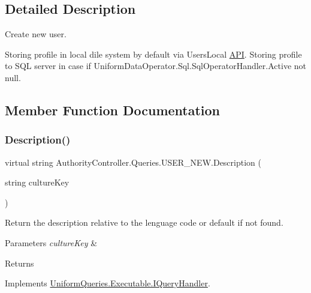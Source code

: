 \subsection{Detailed Description}
Create new user. 

Storing profile in local dile system by default via Users\+Local \mbox{\hyperlink{namespace_authority_controller_1_1_a_p_i}{A\+PI}}. Storing profile to S\+QL server in case if {\ttfamily Uniform\+Data\+Operator.\+Sql.\+Sql\+Operator\+Handler.\+Active} not null. 

\subsection{Member Function Documentation}
\mbox{\label{class_authority_controller_1_1_queries_1_1_u_s_e_r___n_e_w_a16439c165f3ac2ca8b586dd8bfd2bf55}} 
\subsubsection{\texorpdfstring{Description()}{Description()}}
{\footnotesize\ttfamily virtual string Authority\+Controller.\+Queries.\+U\+S\+E\+R\+\_\+\+N\+E\+W.\+Description (\begin{DoxyParamCaption}\item[{string}]{culture\+Key }\end{DoxyParamCaption})\hspace{0.3cm}{\ttfamily [virtual]}}



Return the description relative to the lenguage code or default if not found. 


\begin{DoxyParams}{Parameters}
{\em culture\+Key} & \\
\hline
\end{DoxyParams}
\begin{DoxyReturn}{Returns}

\end{DoxyReturn}


Implements \mbox{\hyperlink{interface_uniform_queries_1_1_executable_1_1_i_query_handler_ae0e55919571d5456af31298394d241a9}{Uniform\+Queries.\+Executable.\+I\+Query\+Handler}}.

